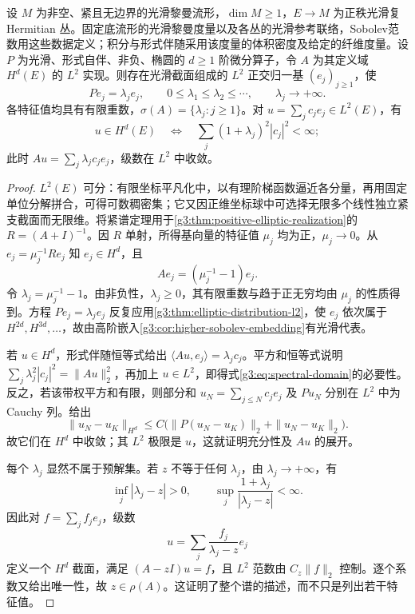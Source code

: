 \begin{theorem}\label{g3:thm:elliptic-discrete-spectrum}
	设 \(M\) 为非空、紧且无边界的光滑黎曼流形，\(\dim M\ge1\)，\(E\to M\) 为正秩光滑复 Hermitian 丛。固定底流形的光滑黎曼度量以及各丛的光滑参考联络，Sobolev范数用这些数据定义；积分与形式伴随采用该度量的体积密度及给定的纤维度量。设 \(P\) 为光滑、形式自伴、非负、椭圆的 \(d\ge1\) 阶微分算子，令 \(A\) 为其定义域 \(H^d(E)\) 的 \(L^2\) 实现。则存在光滑截面组成的 \(L^2\) 正交归一基 \((e_j)_{j\ge1}\)，使
	\[
		Pe_j=\lambda_je_j,\qquad
		0\le\lambda_1\le\lambda_2\le\cdots,
		\qquad \lambda_j\longrightarrow+\infty.
	\]
	各特征值均具有有限重数，\(\sigma(A)=\{\lambda_j:j\ge1\}\)。对 \(u=\sum_jc_je_j\in L^2(E)\)，有
	\begin{equation}\label{g3:eq:spectral-domain}
		u\in H^d(E)
		\quad\Longleftrightarrow\quad
		\sum_j(1+\lambda_j)^2|c_j|^2<\infty;
	\end{equation}
	此时 \(Au=\sum_j\lambda_jc_je_j\)，级数在 \(L^2\) 中收敛。
\end{theorem}
\begin{proof}
	\(L^2(E)\) 可分：有限坐标平凡化中，以有理阶梯函数逼近各分量，再用固定单位分解拼合，可得可数稠密集；它又因正维坐标球中可选择无限多个线性独立紧支截面而无限维。将紧谱定理用于\cref{g3:thm:positive-elliptic-realization}的 \(R=(A+I)^{-1}\)。因 \(R\) 单射，所得基向量的特征值 \(\mu_j\) 均为正，\(\mu_j\to0\)。从 \(e_j=\mu_j^{-1}Re_j\) 知 \(e_j\in H^d\)，且
	\[
		Ae_j=(\mu_j^{-1}-1)e_j.
	\]
	令 \(\lambda_j=\mu_j^{-1}-1\)。由非负性，\(\lambda_j\ge0\)，其有限重数与趋于正无穷均由 \(\mu_j\) 的性质得到。方程 \(Pe_j=\lambda_je_j\) 反复应用\cref{g3:thm:elliptic-distribution-l2}，使 \(e_j\) 依次属于 \(H^{2d},H^{3d},\ldots\)，故由高阶嵌入\cref{g3:cor:higher-sobolev-embedding}有光滑代表。

	若 \(u\in H^d\)，形式伴随恒等式给出 \(\langle Au,e_j\rangle=\lambda_jc_j\)。平方和恒等式说明 \(\sum_j\lambda_j^2|c_j|^2=\|Au\|_2^2\)，再加上 \(u\in L^2\)，即得式\eqref{g3:eq:spectral-domain}的必要性。反之，若该带权平方和有限，则部分和 \(u_N=\sum_{j\le N}c_je_j\) 及 \(Pu_N\) 分别在 \(L^2\) 中为 Cauchy 列。给出
	\[
		\|u_N-u_K\|_{H^d}
		\le C\bigl(\|P(u_N-u_K)\|_2+\|u_N-u_K\|_2\bigr).
	\]
	故它们在 \(H^d\) 中收敛；其 \(L^2\) 极限是 \(u\)，这就证明充分性及 \(Au\) 的展开。

	每个 \(\lambda_j\) 显然不属于预解集。若 \(z\) 不等于任何 \(\lambda_j\)，由 \(\lambda_j\to+\infty\)，有
	\[
		\inf_j|\lambda_j-z|>0,\qquad
		\sup_j\frac{1+\lambda_j}{|\lambda_j-z|}<\infty.
	\]
	因此对 \(f=\sum_jf_je_j\)，级数
	\[
		u=\sum_j\frac{f_j}{\lambda_j-z}e_j
	\]
	定义一个 \(H^d\) 截面，满足 \((A-zI)u=f\)，且 \(L^2\) 范数由 \(C_z\|f\|_2\) 控制。逐个系数又给出唯一性，故 \(z\in\rho(A)\)。这证明了整个谱的描述，而不只是列出若干特征值。
\end{proof}

